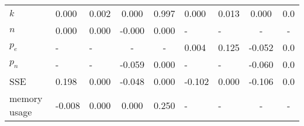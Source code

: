 \begin{tabular}{lggccggcc}
$k$                    &  0.000 &  0.002 &  0.000 &  0.997 &  0.000 &  0.013 &  0.000 &    0.0 \\
$n$                    &  0.000 &  0.000 & -0.000 &  0.000 &    -   &    -   &    -   &    -   \\
$p_e$                  &    -   &    -   &    -   &    -   &  0.004 &  0.125 & -0.052 &    0.0 \\
$p_n$                  &    -   &    -   & -0.059 &  0.000 &    -   &    -   & -0.060 &    0.0 \\
SSE                    &  0.198 &  0.000 & -0.048 &  0.000 & -0.102 &  0.000 & -0.106 &    0.0 \\
memory usage           & -0.008 &  0.000 &  0.000 &  0.250 &    -   &    -   &    -   &    -   \\
\bottomrule
\end{tabular}